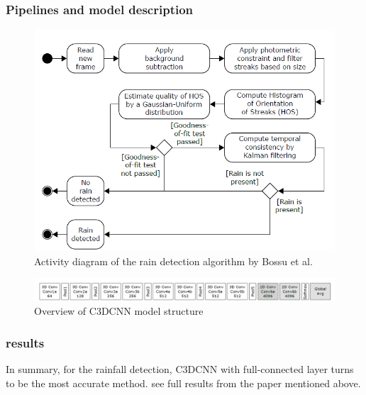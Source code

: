 \documentclass{article}
\begin{document}
\subsubsection{Pipelines and model description}

\begin{figure}[H]
\centering
\includegraphics[width=\linewidth]{surveilance_camera_pipeline}
\caption{Activity diagram of the rain detection algorithm by Bossu et al.}
\end{figure}
\begin{figure}[H]
\centering
\includegraphics[width=\linewidth]{surveilance_camera_pipeline_CNN}
\caption{Overview of C3DCNN model structure}
\end{figure}

\subsubsection{results}
In summary, for the rainfall detection, C3DCNN with full-connected layer turns to be the most accurate method. see full results from the paper mentioned above.
\end{document}
